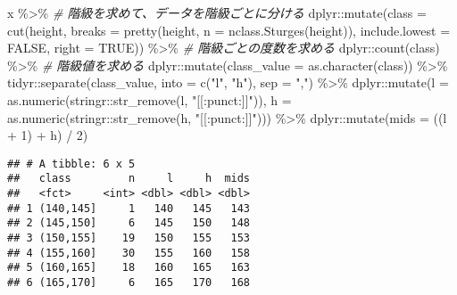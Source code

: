 \documentclass[
  12pt,
]{book}
\newenvironment{Shaded}{\begin{snugshade}}{\end{snugshade}}
\newcommand{\AttributeTok}[1]{\textcolor[rgb]{0.77,0.63,0.00}{#1}}
\newcommand{\CommentTok}[1]{\textcolor[rgb]{0.56,0.35,0.01}{\textit{#1}}}
\newcommand{\ConstantTok}[1]{\textcolor[rgb]{0.00,0.00,0.00}{#1}}
\newcommand{\DecValTok}[1]{\textcolor[rgb]{0.00,0.00,0.81}{#1}}
\newcommand{\FunctionTok}[1]{\textcolor[rgb]{0.00,0.00,0.00}{#1}}
\newcommand{\NormalTok}[1]{#1}
\newcommand{\SpecialCharTok}[1]{\textcolor[rgb]{0.00,0.00,0.00}{#1}}
\newcommand{\StringTok}[1]{\textcolor[rgb]{0.31,0.60,0.02}{#1}}
\begin{document}
\begin{Shaded}
\begin{Highlighting}[]
\NormalTok{x }\SpecialCharTok{\%\textgreater{}\%} 
  \CommentTok{\# 階級を求めて、データを階級ごとに分ける}
\NormalTok{  dplyr}\SpecialCharTok{::}\FunctionTok{mutate}\NormalTok{(}\AttributeTok{class =} \FunctionTok{cut}\NormalTok{(height,}
                            \AttributeTok{breaks =} \FunctionTok{pretty}\NormalTok{(height, }\AttributeTok{n =} \FunctionTok{nclass.Sturges}\NormalTok{(height)),}
                            \AttributeTok{include.lowest =} \ConstantTok{FALSE}\NormalTok{, }\AttributeTok{right =} \ConstantTok{TRUE}\NormalTok{)) }\SpecialCharTok{\%\textgreater{}\%} 
  \CommentTok{\# 階級ごとの度数を求める}
\NormalTok{  dplyr}\SpecialCharTok{::}\FunctionTok{count}\NormalTok{(class) }\SpecialCharTok{\%\textgreater{}\%} 
  \CommentTok{\# 階級値を求める}
\NormalTok{  dplyr}\SpecialCharTok{::}\FunctionTok{mutate}\NormalTok{(}\AttributeTok{class\_value =} \FunctionTok{as.character}\NormalTok{(class)) }\SpecialCharTok{\%\textgreater{}\%} 
\NormalTok{  tidyr}\SpecialCharTok{::}\FunctionTok{separate}\NormalTok{(class\_value, }\AttributeTok{into =} \FunctionTok{c}\NormalTok{(}\StringTok{"l"}\NormalTok{, }\StringTok{"h"}\NormalTok{), }\AttributeTok{sep =} \StringTok{","}\NormalTok{) }\SpecialCharTok{\%\textgreater{}\%} 
\NormalTok{  dplyr}\SpecialCharTok{::}\FunctionTok{mutate}\NormalTok{(}\AttributeTok{l =} \FunctionTok{as.numeric}\NormalTok{(stringr}\SpecialCharTok{::}\FunctionTok{str\_remove}\NormalTok{(l, }\StringTok{"[[:punct:]]"}\NormalTok{)),}
                \AttributeTok{h =} \FunctionTok{as.numeric}\NormalTok{(stringr}\SpecialCharTok{::}\FunctionTok{str\_remove}\NormalTok{(h, }\StringTok{"[[:punct:]]"}\NormalTok{))) }\SpecialCharTok{\%\textgreater{}\%} 
\NormalTok{  dplyr}\SpecialCharTok{::}\FunctionTok{mutate}\NormalTok{(}\AttributeTok{mids =}\NormalTok{ ((l }\SpecialCharTok{+} \DecValTok{1}\NormalTok{) }\SpecialCharTok{+}\NormalTok{ h) }\SpecialCharTok{/} \DecValTok{2}\NormalTok{)}
\end{Highlighting}
\end{Shaded}

\begin{verbatim}
## # A tibble: 6 x 5
##   class         n     l     h  mids
##   <fct>     <int> <dbl> <dbl> <dbl>
## 1 (140,145]     1   140   145   143
## 2 (145,150]     6   145   150   148
## 3 (150,155]    19   150   155   153
## 4 (155,160]    30   155   160   158
## 5 (160,165]    18   160   165   163
## 6 (165,170]     6   165   170   168
\end{verbatim}
\end{document}
